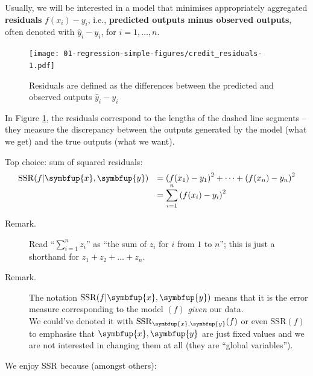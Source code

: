 \documentclass[10pt,b5paper,krantz1]{krantz}
\renewcommand{\mathbf}[1]{\symbfup{#1}}
\begin{document}
Usually, we will be interested in a model
that minimises appropriately aggregated \textbf{residuals}
\(f(x_i)-y_i\), i.e.,
\textbf{predicted outputs minus observed outputs},
often denoted with \(\hat{y}_i-y_i\),
for \(i=1,\dots,n\).

\begin{figure}
\hypertarget{fig:credit_residuals}{%
\centering
\texttt{[image: 01-regression-simple-figures/credit\_residuals-1.pdf]}
\caption{Residuals are defined as the differences between the predicted and observed outputs \(\hat{y}_i-y_i\)}\label{fig:credit_residuals}
}
\end{figure}

In Figure \ref{fig:credit_residuals}, the residuals correspond to the
lengths of the dashed line segments -- they measure the discrepancy between
the outputs generated by the model (what we get)
and the true outputs (what we want).

Top choice: sum of squared residuals:
\[
\begin{array}{rl}
\mathrm{SSR}(f|\mathbf{x},\mathbf{y})
& = \left( f(x_1)-y_1 \right)^2 + \dots + \left( f(x_n)-y_n \right)^2 \\
& =
\displaystyle\sum_{i=1}^n \left( f(x_i)-y_i \right)^2
\end{array}
\]

\begin{description}
\item[Remark.]
Read ``\(\sum_{i=1}^n z_i\)'' as ``the sum of \(z_i\) for \(i\) from \(1\) to \(n\)'';
this is just a shorthand for \(z_1+z_2+\dots+z_n\).
\item[Remark.]
The notation \(\mathrm{SSR}(f|\mathbf{x},\mathbf{y})\) means that
it is the error measure
corresponding to the model \((f)\) \emph{given} our data.\\
We could've denoted it with \(\mathrm{SSR}_{\mathbf{x},\mathbf{y}}(f)\)
or even \(\mathrm{SSR}(f)\) to emphasise that \(\mathbf{x},\mathbf{y}\)
are just fixed values and we are not interested
in changing them at all (they are ``global variables'').
\end{description}

We enjoy SSR because (amongst others):
\end{document}
